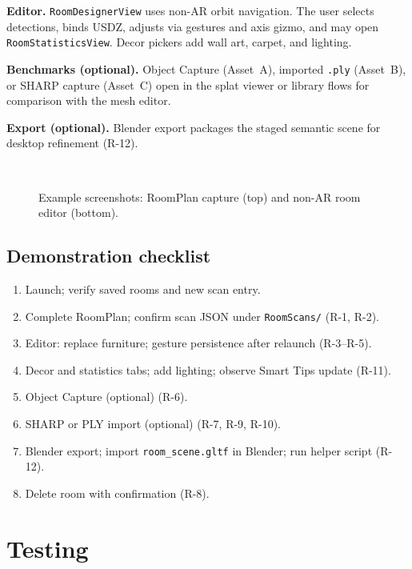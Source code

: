 \textbf{Editor.} \texttt{RoomDesignerView} uses non-AR orbit navigation. The user selects detections, binds USDZ, adjusts via gestures and axis gizmo, and may open \texttt{RoomStatisticsView}. Decor pickers add wall art, carpet, and lighting.

\textbf{Benchmarks (optional).} Object Capture (Asset~A), imported \texttt{.ply} (Asset~B), or SHARP capture (Asset~C) open in the splat viewer or library flows for comparison with the mesh editor.

\textbf{Export (optional).} Blender export packages the staged semantic scene for desktop refinement (R-12).

\begin{figure}[htbp]
\centering
{}\\[0.6em]
\caption{Example screenshots: RoomPlan capture (top) and non-AR room editor (bottom).}
\label{fig:ui_scan_editor}
\end{figure}

\subsection{Demonstration checklist}

\begin{enumerate}
    \item Launch; verify saved rooms and new scan entry.
    \item Complete RoomPlan; confirm scan JSON under \texttt{RoomScans/} (R-1, R-2).
    \item Editor: replace furniture; gesture persistence after relaunch (R-3--R-5).
    \item Decor and statistics tabs; add lighting; observe Smart Tips update (R-11).
    \item Object Capture (optional) (R-6).
    \item SHARP or PLY import (optional) (R-7, R-9, R-10).
    \item Blender export; import \texttt{room\_scene.gltf} in Blender; run helper script (R-12).
    \item Delete room with confirmation (R-8).
\end{enumerate}

\section{Testing}

